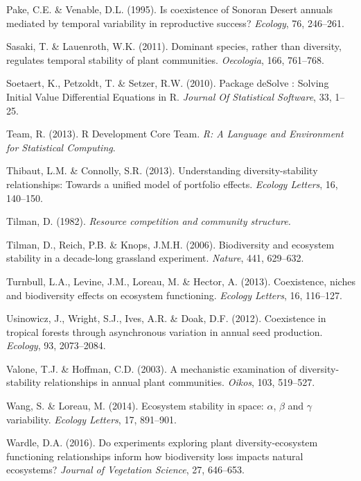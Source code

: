 \documentclass[12pt,]{article}
\begin{document}
\hypertarget{ref-Pake1995}{}
Pake, C.E. \& Venable, D.L. (1995). Is coexistence of Sonoran Desert
annuals mediated by temporal variability in reproductive success?
\emph{Ecology}, 76, 246--261.

\hypertarget{ref-Sasaki2011}{}
Sasaki, T. \& Lauenroth, W.K. (2011). Dominant species, rather than
diversity, regulates temporal stability of plant communities.
\emph{Oecologia}, 166, 761--768.

\hypertarget{ref-Soetaert2010}{}
Soetaert, K., Petzoldt, T. \& Setzer, R.W. (2010). Package deSolve :
Solving Initial Value Differential Equations in R. \emph{Journal Of
Statistical Software}, 33, 1--25.

\hypertarget{ref-Team2013}{}
Team, R. (2013). R Development Core Team. \emph{R: A Language and
Environment for Statistical Computing}.

\hypertarget{ref-Thibaut2013}{}
Thibaut, L.M. \& Connolly, S.R. (2013). Understanding
diversity-stability relationships: Towards a unified model of portfolio
effects. \emph{Ecology Letters}, 16, 140--150.

\hypertarget{ref-Tilman1982}{}
Tilman, D. (1982). \emph{Resource competition and community structure.}

\hypertarget{ref-Tilman2006}{}
Tilman, D., Reich, P.B. \& Knops, J.M.H. (2006). Biodiversity and
ecosystem stability in a decade-long grassland experiment.
\emph{Nature}, 441, 629--632.

\hypertarget{ref-Turnbull2013}{}
Turnbull, L.A., Levine, J.M., Loreau, M. \& Hector, A. (2013).
Coexistence, niches and biodiversity effects on ecosystem functioning.
\emph{Ecology Letters}, 16, 116--127.

\hypertarget{ref-Usinowicz2012}{}
Usinowicz, J., Wright, S.J., Ives, A.R. \& Doak, D.F. (2012).
Coexistence in tropical forests through asynchronous variation in annual
seed production. \emph{Ecology}, 93, 2073--2084.

\hypertarget{ref-Valone2003}{}
Valone, T.J. \& Hoffman, C.D. (2003). A mechanistic examination of
diversity-stability relationships in annual plant communities.
\emph{Oikos}, 103, 519--527.

\hypertarget{ref-Wang2014}{}
Wang, S. \& Loreau, M. (2014). Ecosystem stability in space: \(\alpha\),
\(\beta\) and \(\gamma\) variability. \emph{Ecology Letters}, 17,
891--901.

\hypertarget{ref-Wardle2016}{}
Wardle, D.A. (2016). Do experiments exploring plant diversity-ecosystem
functioning relationships inform how biodiversity loss impacts natural
ecosystems? \emph{Journal of Vegetation Science}, 27, 646--653.
\end{document}
